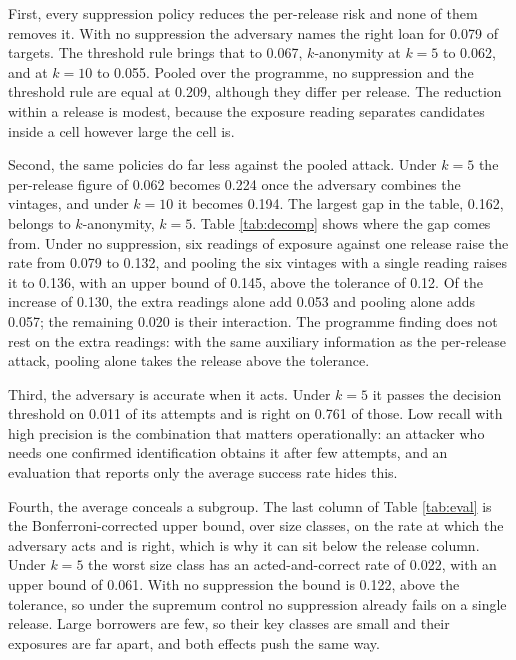 \documentclass[11pt,a4paper]{article}
\theoremstyle{plain}
\theoremstyle{definition}
\begin{document}
First, every suppression policy reduces the per-release risk and none of them
removes it. With no suppression the adversary names the right loan for
0.079 of targets. The threshold rule brings that to
0.067, $k$-anonymity at $k=5$ to 0.062, and at $k=10$ to
0.055. Pooled over the programme, no suppression and the threshold rule are
equal at 0.209, although they differ per release. The reduction within a release
is modest, because the exposure reading separates candidates inside a cell
however large the cell is.

Second, the same policies do far less against the pooled attack.
Under $k=5$ the per-release figure of 0.062 becomes 0.224
once the adversary combines the vintages, and under $k=10$ it becomes
0.194. The largest gap in the table, 0.162, belongs to
$k$-anonymity, $k=5$. Table \ref{tab:decomp} shows where the gap comes from.
Under no suppression, six readings of exposure against one release raise the
rate from 0.079 to 0.132, and pooling the six vintages with a single reading
raises it to 0.136, with an upper bound of 0.145, above the tolerance of 0.12.
Of the increase of 0.130, the extra readings alone add 0.053 and pooling alone
adds 0.057; the remaining 0.020 is their interaction. The programme finding does not rest on the extra readings:
with the same auxiliary information as the per-release attack, pooling alone
takes the release above the tolerance.

\begingroup\let\small\scriptsize\setlength{\tabcolsep}{2pt}\endgroup

Third, the adversary is accurate when it acts. Under $k=5$ it passes the decision
threshold on 0.011 of its attempts and is right on
0.761 of those. Low recall with high precision is the combination that matters
operationally: an attacker who needs one confirmed identification obtains it
after few attempts, and an evaluation that reports only the average success rate hides
this.

Fourth, the average conceals a subgroup. The last column of Table
\ref{tab:eval} is the Bonferroni-corrected upper bound, over size classes, on
the rate at which the adversary acts and is right, which is why it can sit below
the release column. Under $k=5$ the worst size class has an acted-and-correct
rate of 0.022, with an upper bound of 0.061. With no suppression the bound is
0.122, above the tolerance, so under the supremum control no suppression
already fails on a single release. Large borrowers are few, so their key classes
are small and their exposures are far apart, and both effects push the same way.
\end{document}
